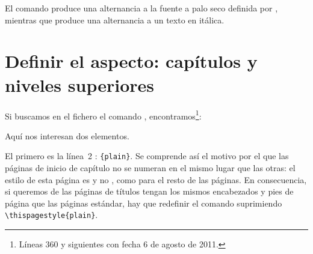 \begin{latexcode}
\makeatletter
\renewcommand\section{\@startsection {section}{1}{\z@}%
                             {-3.5ex \@plus -1ex \@minus -.2ex}%
                             {2.3ex \@plus.2ex}%
                             {\sffamily\Large\itshape}}
\makeatother
\end{latexcode}

El comando  produce una alternancia a la fuente a palo seco definida por , mientras que  produce una alternancia a un texto en itálica.

\section{Definir el aspecto: capítulos y niveles superiores}

Si buscamos en el fichero  el comando , encontramos\footnote{Líneas 360 y siguientes con fecha 6 de agosto de 2011.}:

\begin{latexcode}
\newcommand\chapter{\if@openright\cleardoublepage\else\clearpage\fi
                    \thispagestyle{plain}%
                    \global\@topnum\z@
                    \@afterindentfalse
                    \secdef\@chapter\@schapter}
\end{latexcode}

Aquí nos interesan dos elementos. 

El primero es la línea~2 : \verb|{plain}|. Se comprende así el motivo por el que las páginas de inicio de capítulo no se numeran en el mismo lugar que las otras: el estilo de esta página es  y no , como para el resto de las páginas. En consecuencia, si queremos de las páginas de títulos tengan los mismos encabezados y pies de página que las páginas estándar, hay que redefinir el comando  suprimiendo \verb|\thispagestyle{plain}|.\label{entetechapter}\label{chapitrepagestyle}

\begin{latexcode}
\makeatletter
\renewcommand\chapter{\if@openright\cleardoublepage %
                    \else\clearpage\fi
                    \global\@topnum\z@
                    \@afterindentfalse
                    \secdef\@chapter\@schapter}
\makeatother
\end{latexcode}

